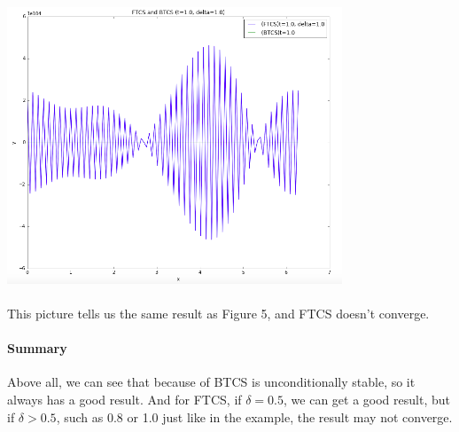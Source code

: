 \documentclass[UTF8]{article}
\begin{document}
\includegraphics[width=10cm]{7.png}

\paragraph{}
This picture tells us the same result as Figure 5, and FTCS doesn't converge.

\paragraph{Summary}
Above all, we can see that because of BTCS is unconditionally stable, so it always has a good result. And for FTCS, if $\delta = 0.5$, we can get a good result, but if $\delta > 0.5$, such as 0.8 or 1.0 just like in the example, the result may not converge.
\end{document}
